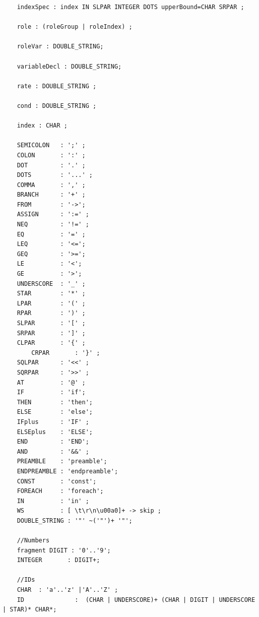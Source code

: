 \begin{verbatim}
	indexSpec : index IN SLPAR INTEGER DOTS upperBound=CHAR SRPAR ; 
	
	role : (roleGroup | roleIndex) ;
	
	roleVar : DOUBLE_STRING;
	
	variableDecl : DOUBLE_STRING;
	
	rate : DOUBLE_STRING ;
	
	cond : DOUBLE_STRING ; 
	
	index : CHAR ;
	
	SEMICOLON   : ';' ;
	COLON 		: ':' ;
	DOT 		: '.' ;
	DOTS 		: '...' ;
	COMMA		: ',' ;
	BRANCH 		: '+' ;
	FROM 		: '->';
	ASSIGN 		: ':=' ;
	NEQ 		: '!=' ;
	EQ 			: '=' ;
	LEQ			: '<=';
	GEQ			: '>=';
	LE			: '<';
	GE			: '>';
	UNDERSCORE 	: '_' ;
	STAR 		: '*' ;
	LPAR   		: '(' ;
	RPAR   		: ')' ;
	SLPAR   	: '[' ;
	SRPAR   	: ']' ;
	CLPAR  		: '{' ;
		CRPAR  		: '}' ;
	SQLPAR		: '<<' ;
	SQRPAR		: '>>' ;
	AT 			: '@' ;
	IF 			: 'if';
	THEN		: 'then';
	ELSE		: 'else';
	IFplus  	: 'IF' ;
	ELSEplus	: 'ELSE';
	END 		: 'END';
	AND			: '&&' ;
	PREAMBLE	: 'preamble';
	ENDPREAMBLE : 'endpreamble';
	CONST 		: 'const';
	FOREACH		: 'foreach';
	IN			: 'in' ;
	WS  		: [ \t\r\n\u00a0]+ -> skip ;
	DOUBLE_STRING : '"' ~('"')+ '"';
	
	//Numbers
	fragment DIGIT : '0'..'9';    
	INTEGER       : DIGIT+;
	
	//IDs
	CHAR  : 'a'..'z' |'A'..'Z' ;
	ID              :  (CHAR | UNDERSCORE)+ (CHAR | DIGIT | UNDERSCORE | STAR)* CHAR*;
	
	\end{verbatim}
\label{lst:full_grammar}
\newpage
